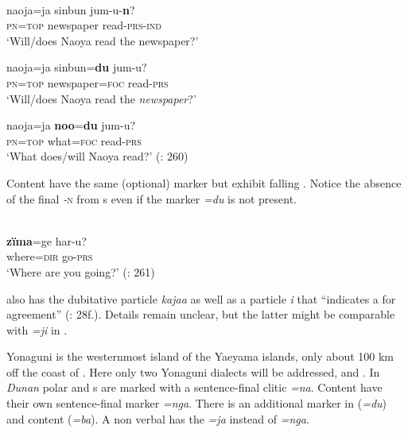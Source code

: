 \ea%
    \label{ex:japa:48}
    \\
    \ea
    \gll naoja=ja sinbun jum-u-\textbf{{n}}?\\
    \textsc{pn}=\textsc{top}  newspaper    read-\textsc{prs}-\textsc{ind}\\
    \glt ‘Will/does Naoya read the newspaper?’
    
    \ex
    \gll naoja=ja sinbun=\textbf{{du}} jum-{u?}\\
    \textsc{pn}=\textsc{top}  newspaper=\textsc{foc}  read-\textsc{prs}\\
    \glt ‘Will/does Naoya read the \textit{newspaper}?’
    
    \ex
    \gll naoja=ja \textbf{{noo}}=\textbf{{du}} jum-u?\\
    \textsc{pn}=\textsc{top}  what=\textsc{foc}    read-\textsc{prs}\\
    \glt ‘What does/will Naoya read?’ (\citealt{Davis2015}: 260)
    \z
    \z 

Content  have the same (optional)  marker but exhibit falling . Notice the absence of the final \textit{-}\textsc{n} from s even if the  marker \textit{=du} is not present.

\ea%
    \label{ex:japa:49}
    \\
    \gll \textbf{{zïma}}=ge har-u?\\
    where=\textsc{dir}  go-\textsc{prs}\\
    \glt ‘Where are you going?’ (\citealt{Davis2015}: 261)
    \z

 also has the dubitative particle \textit{kajaa} as well as a particle \textit{i} that “indicates a  for agreement” (\citealt{Izuyama2003}: 28f.). Details remain unclear, but the latter might be comparable with \textit{=ji} in .

Yonaguni is the westernmost island of the Yaeyama islands, only about 100 km off the coast of . Here only two Yonaguni dialects will be addressed,  and . In \textit{Dunan} polar and s are marked with a sentence-final clitic \textit{=na}. Content  have their own sentence-final marker \textit{=nga}. There is an additional  marker in  (\textit{=du}) and content  (\textit{=ba}). A non verbal  has the  \textit{=ja} instead of \textit{=nga}.

